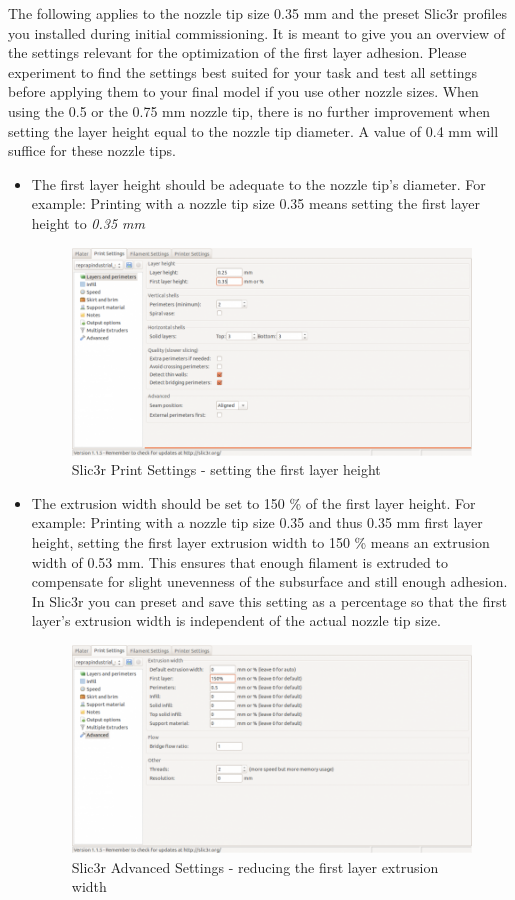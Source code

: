 \begin{info}
The following applies to the nozzle tip size 0.35 mm and the preset Slic3r profiles you installed during initial commissioning. It is meant to give you an overview of the settings relevant for the optimization of the first layer adhesion. Please experiment to find the settings best suited for your task and test all settings before applying them to your final model if you use other nozzle sizes.
When using the 0.5 or the 0.75 mm nozzle tip, there is no further improvement when setting the layer height equal to the nozzle tip diameter. A value of 0.4 mm will suffice for these nozzle tips. 
\end{info}

\begin{itemize}
  \item The first layer height should be adequate to the nozzle tip's diameter.
        For example:
        Printing with a nozzle tip size 0.35 
        means setting the first layer height to \emph{0.35 mm}

    \begin{figure}[H]
      \centering
      \includegraphics[width=.7\linewidth]{./img/slic3r_firstlayersettings.png}
      \caption{Slic3r Print Settings - setting the first layer height}
    \end{figure}

  \item The extrusion width should be set to 150 \% of the first layer height.
        For example:
        Printing with a nozzle tip size 0.35 and thus 0.35 mm first layer height, setting the first layer extrusion width to 150 \% means an extrusion width of 0.53 mm. This ensures that enough filament is extruded to compensate for slight unevenness of the subsurface and still enough adhesion.
        In Slic3r you can preset and save this setting as a percentage so that the first layer's extrusion width is independent of the actual nozzle tip size.

    \begin{figure}[H]
      \centering
      \includegraphics[width=.7\linewidth]{./img/slic3r_advancedsettings.png}
      \caption{Slic3r Advanced Settings - reducing the first layer extrusion width}
    \end{figure}
    

\end{itemize}
